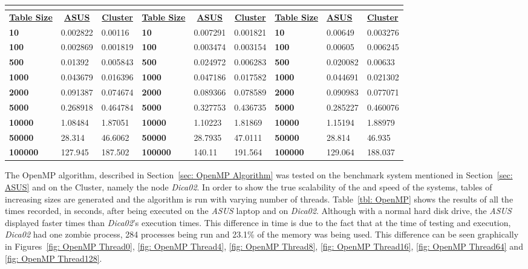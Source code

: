\documentclass[10pt, conference]{IEEEtran}
\begin{document}
\begin{table}[h!]
\begin{tabular}{|l|l|l|l|l|l|l|l|l|}
\multicolumn{3}{|c|}{\cellcolor[HTML]{C0C0C0}{\ul \textbf{Threads = 16}}} & \multicolumn{3}{c|}{\cellcolor[HTML]{C0C0C0}{\ul \textbf{Threads = 64}}} & \multicolumn{3}{c|}{\cellcolor[HTML]{C0C0C0}{\ul \textbf{Threads = 128}}} \\ \hline
\multicolumn{1}{|c|}{{\ul \textbf{Table Size}}} & \multicolumn{1}{c|}{{\ul \textbf{ASUS}}} & \multicolumn{1}{c|}{{\ul \textbf{Cluster}}} & \multicolumn{1}{c|}{{\ul \textbf{Table Size}}} & \multicolumn{1}{c|}{{\ul \textbf{ASUS}}} & \multicolumn{1}{c|}{{\ul \textbf{Cluster}}} & {\ul \textbf{Table Size}} & {\ul \textbf{ASUS}} & {\ul \textbf{Cluster}} \\ \hline
\textbf{10} & 0.002822 & 0.00116 & \textbf{10} & 0.007291 & 0.001821 & \textbf{10} & 0.00649 & 0.003276 \\ \hline
\textbf{100} & 0.002869 & 0.001819 & \textbf{100} & 0.003474 & 0.003154 & \textbf{100} & 0.00605 & 0.006245 \\ \hline
\textbf{500} & 0.01392 & 0.005843 & \textbf{500} & 0.024972 & 0.006283 & \textbf{500} & 0.020082 & 0.00633 \\ \hline
\textbf{1000} & 0.043679 & 0.016396 & \textbf{1000} & 0.047186 & 0.017582 & \textbf{1000} & 0.044691 & 0.021302 \\ \hline
\textbf{2000} & 0.091387 & 0.074674 & \textbf{2000} & 0.089366 & 0.078589 & \textbf{2000} & 0.090983 & 0.077071 \\ \hline
\textbf{5000} & 0.268918 & 0.464784 & \textbf{5000} & 0.327753 & 0.436735 & \textbf{5000} & 0.285227 & 0.460076 \\ \hline
\textbf{10000} & 1.08484 & 1.87051 & \textbf{10000} & 1.10223 & 1.81869 & \textbf{10000} & 1.15194 & 1.88979 \\ \hline
\textbf{50000} & 28.314 & 46.6062 & \textbf{50000} & 28.7935 & 47.0111 & \textbf{50000} & 28.814 & 46.935 \\ \hline
\textbf{100000} & 127.945 & 187.502 & \textbf{100000} & 140.11 & 191.564 & \textbf{100000} & 129.064 & 188.037 \\ \hline
\end{tabular}
\end{table}

The OpenMP algorithm, described in Section~\ref{sec: OpenMP Algorithm} was tested on the benchmark system mentioned in Section~\ref{sec: ASUS} and on the Cluster, namely the node \emph{Dica02}. In order to show the true scalability of the and speed of the systems, tables of increasing sizes are generated and the algorithm is run with varying number of threads. Table~\ref{tbl: OpenMP} shows the results of all the times recorded, in seconds, after being executed on the \emph{ASUS} laptop and on \emph{Dica02}. Although with a normal hard disk drive, the \emph{ASUS} displayed faster times than \emph{Dica02}'s execution times. This difference in time is due to the fact that at the time of testing and execution, \emph{Dica02} had one zombie process, 284 processes being run and 23.1\% of the memory was being used. This difference can be seen graphically in Figures~\ref{fig: OpenMP Thread0}, \ref{fig: OpenMP Thread4}, \ref{fig: OpenMP Thread8}, \ref{fig: OpenMP Thread16}, \ref{fig: OpenMP Thread64} and \ref{fig: OpenMP Thread128}.
\end{document}
